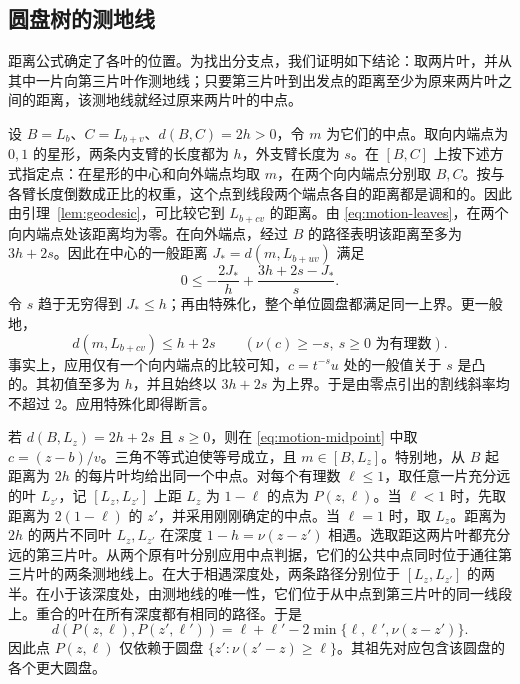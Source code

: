 \subsection{圆盘树的测地线}

距离公式确定了各叶的位置。为找出分支点，我们证明如下结论：取两片叶，并从其中一片向第三片叶作测地线；只要第三片叶到出发点的距离至少为原来两片叶之间的距离，该测地线就经过原来两片叶的中点。

设 \(B=L_b\)、\(C=L_{b+v}\)、\(d(B,C)=2h>0\)，令 \(m\) 为它们的中点。取向内端点为 \(0,1\) 的星形，两条内支臂的长度都为 \(h\)，外支臂长度为 \(s\)。在 \([B,C]\) 上按下述方式指定点：在星形的中心和向外端点均取 \(m\)，在两个向内端点分别取 \(B,C\)。按与各臂长度倒数成正比的权重，这个点到线段两个端点各自的距离都是调和的。因此由引理~\ref{lem:geodesic}，可比较它到 \(L_{b+cv}\) 的距离。由 \eqref{eq:motion-leaves}，在两个向内端点处该距离均为零。在向外端点，经过 \(B\) 的路径表明该距离至多为 \(3h+2s\)。因此在中心的一般距离 \(J_*=d(m,L_{b+uv})\) 满足
\[
  0\le-\frac{2J_*}{h}+\frac{3h+2s-J_*}{s}.
\]
令 \(s\) 趋于无穷得到 \(J_*\le h\)；再由特殊化，整个单位圆盘都满足同一上界。更一般地，
\begin{equation}\label{eq:motion-midpoint}
 d(m,L_{b+cv})\le h+2s \qquad(\nu(c)\ge-s,\ s\ge0 \text{ 为有理数}).
\end{equation}
事实上，应用仅有一个向内端点的比较可知，\(c=t^{-s}u\) 处的一般值关于 \(s\) 是凸的。其初值至多为 \(h\)，并且始终以 \(3h+2s\) 为上界。于是由零点引出的割线斜率均不超过 \(2\)。应用特殊化即得断言。

若 \(d(B,L_z)=2h+2s\) 且 \(s\ge0\)，则在 \eqref{eq:motion-midpoint} 中取 \(c=(z-b)/v\)。三角不等式迫使等号成立，且 \(m\in[B,L_z]\)。特别地，从 \(B\) 起距离为 \(2h\) 的每片叶均给出同一个中点。对每个有理数 \(\ell\le1\)，取任意一片充分远的叶 \(L_{z'}\)，记 \([L_z,L_{z'}]\) 上距 \(L_z\) 为 \(1-\ell\) 的点为 \(P(z,\ell)\)。当 \(\ell<1\) 时，先取距离为 \(2(1-\ell)\) 的 \(z'\)，并采用刚刚确定的中点。当 \(\ell=1\) 时，取 \(L_z\)。距离为 \(2h\) 的两片不同叶 \(L_z,L_{z'}\) 在深度 \(1-h=\nu(z-z')\) 相遇。选取距这两片叶都充分远的第三片叶。从两个原有叶分别应用中点判据，它们的公共中点同时位于通往第三片叶的两条测地线上。在大于相遇深度处，两条路径分别位于 \([L_z,L_{z'}]\) 的两半。在小于该深度处，由测地线的唯一性，它们位于从中点到第三片叶的同一线段上。重合的叶在所有深度都有相同的路径。于是
\begin{equation}\label{eq:motion-tree}
 d(P(z,\ell),P(z',\ell'))=
       \ell+\ell'-2\min\{\ell,\ell',\nu(z-z')\}.
\end{equation}
因此点 \(P(z,\ell)\) 仅依赖于圆盘 \(\{z':\nu(z'-z)\ge\ell\}\)。其祖先对应包含该圆盘的各个更大圆盘。

